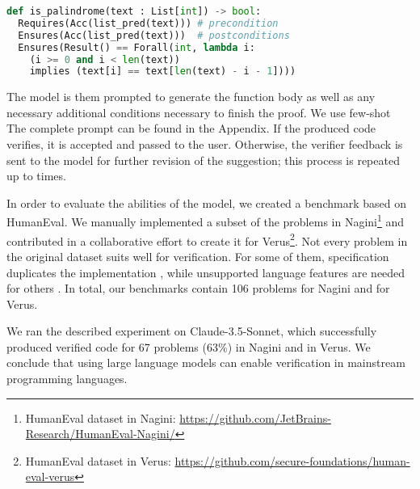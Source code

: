\begin{lstlisting}[language=Python,basicstyle=\footnotesize]
def is_palindrome(text : List[int]) -> bool:
  Requires(Acc(list_pred(text))) # precondition
  Ensures(Acc(list_pred(text)))  # postconditions 
  Ensures(Result() == Forall(int, lambda i:
    (i >= 0 and i < len(text)) 
    implies (text[i] == text[len(text) - i - 1])))
\end{lstlisting}

The model is them prompted to generate the function body as well as any necessary additional conditions necessary to finish the proof.
We use few-shot The complete prompt can be found in the Appendix.
If the produced code verifies, it is accepted and passed to the user. 
Otherwise, the verifier feedback is sent to the model for further revision of the suggestion; this process is repeated up to  times. 

In order to evaluate the abilities of the model, we created a benchmark based on HumanEval\cite{chen2021evaluating}.
We manually implemented a subset of the problems in Nagini\footnote{HumanEval dataset in Nagini: \url{https://github.com/JetBrains-Research/HumanEval-Nagini/}} and contributed in a collaborative effort to create it for Verus\footnote{HumanEval dataset in Verus: \url{https://github.com/secure-foundations/human-eval-verus}}. 
Not every problem in the original dataset suits well for verification. 
For some of them, specification duplicates the implementation , while unsupported language features are needed for others . 
In total, our benchmarks contain 106 problems for Nagini and  for Verus. 

We ran the described experiment on Claude-3.5-Sonnet, which successfully produced verified code for 67 problems (63\%) in Nagini and  in Verus. 
We conclude that using large language models can enable verification in mainstream programming languages. 

